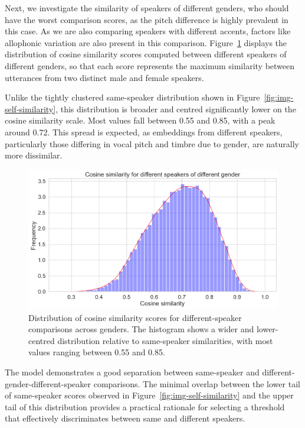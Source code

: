 \documentclass[conference]{IEEEtran}
\begin{document}
	Next, we investigate the similarity of speakers of different genders, who should have the worst comparison scores, as the pitch difference is highly prevalent in this case. As we are also comparing speakers with different accents, factors like allophonic variation are also present in this comparison. Figure~\ref{fig:img-similarity} displays the distribution of cosine similarity scores computed between different speakers of different genders, so that each score represents the maximum similarity between utterances from two distinct male and female speakers.
	
	Unlike the tightly clustered same-speaker distribution shown in Figure~\ref{fig:img-self-similarity}, this distribution is broader and centred significantly lower on the cosine similarity scale. Most values fall between 0.55 and 0.85, with a peak around 0.72. This spread is expected, as embeddings from different speakers, particularly those differing in vocal pitch and timbre due to gender, are naturally more dissimilar.
	
	\begin{figure}[H]
		\centering
		\includegraphics[width=1\linewidth]{img/img-similarity}
		\caption{Distribution of cosine similarity scores for different-speaker comparisons across genders. The histogram shows a wider and lower-centred distribution relative to same-speaker similarities, with most values ranging between 0.55 and 0.85.}
		\label{fig:img-similarity}
	\end{figure}
	
	The model demonstrates a good separation between same-speaker and different-gender-different-speaker comparisons. The minimal overlap between the lower tail of same-speaker scores observed in Figure~\ref{fig:img-self-similarity} and the upper tail of this distribution provides a practical rationale for selecting a threshold that effectively discriminates between same and different speakers.
	
\end{document}
